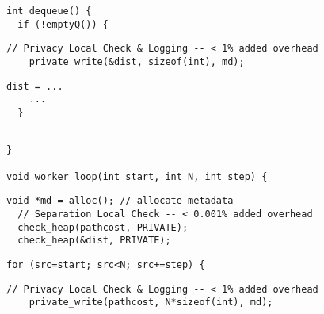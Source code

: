 
\begin{lstlisting}[morekeywords={pathcost}, belowskip=0pt, firstnumber=9, name=dij_checks]
int dequeue() {
  if (!emptyQ()) {
\end{lstlisting}

  \begin{lstlisting}[morekeywords={pathcost,dist}, aboveskip=0pt,belowskip=0pt,backgroundcolor=\color{lightgray},
  firstnumber=auto, name=dij_checks]
    // Privacy Local Check & Logging -- < 1% added overhead
    private_write(&dist, sizeof(int), md);
  \end{lstlisting}

  \begin{lstlisting}[morekeywords={pathcost,dist},aboveskip=0pt,
  belowskip=0pt, firstnumber=auto,name=dij_checks,showlines=true]
    dist = ...
    ...
  }


  \end{lstlisting}

  \begin{lstlisting}[morekeywords={pathcost,dist},aboveskip=0pt, belowskip=0pt,
firstnumber=18,name=dij_checks]
}

void worker_loop(int start, int N, int step) {
\end{lstlisting}

  \begin{lstlisting}[morekeywords={pathcost,dist}, aboveskip=0pt,belowskip=0pt,backgroundcolor=\color{lightgray},
  firstnumber=auto, name=dij_checks]
  void *md = alloc(); // allocate metadata
  // Separation Local Check -- < 0.001% added overhead
  check_heap(pathcost, PRIVATE);
  check_heap(&dist, PRIVATE);
  \end{lstlisting}

  \begin{lstlisting}[morekeywords={pathcost},aboveskip=0pt, belowskip=0pt, firstnumber=auto,name=dij_checks]
  for (src=start; src<N; src+=step) {
  \end{lstlisting}

  \begin{lstlisting}[morekeywords={pathcost}, aboveskip=0pt,belowskip=0pt,backgroundcolor=\color{lightgray},
  firstnumber=auto, name=dij_checks]
    // Privacy Local Check & Logging -- < 1% added overhead
    private_write(pathcost, N*sizeof(int), md);
  \end{lstlisting}


